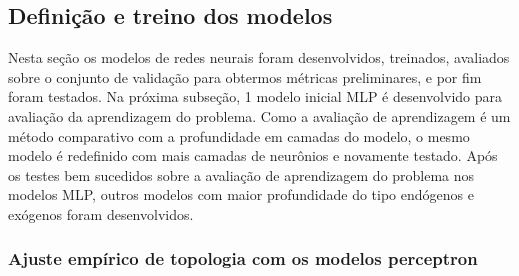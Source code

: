                 
    	\subsection{Definição e treino dos modelos}
    	    Nesta seção os modelos de redes neurais foram desenvolvidos, treinados, avaliados sobre o conjunto de validação para obtermos métricas preliminares, e por fim foram testados.
    	    Na próxima subseção, 1 modelo inicial MLP é desenvolvido para avaliação da aprendizagem do problema.
    	    Como a avaliação de aprendizagem é um método comparativo com a profundidade em camadas do modelo, o mesmo modelo é redefinido com mais camadas de neurônios e novamente testado.
    	    Após os testes bem sucedidos sobre a avaliação de aprendizagem do problema nos modelos MLP, outros modelos com maior profundidade do tipo endógenos e exógenos foram desenvolvidos.
    	    \subsubsection{Ajuste empírico de topologia com os modelos perceptron}
